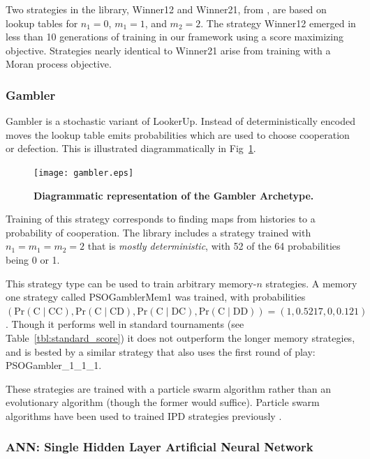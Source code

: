\documentclass[10pt,letterpaper]{article}
\begin{document}
Two strategies in the library, Winner12 and Winner21, from \cite{Mathieu2015},
are based on lookup tables for $n_1 = 0$, $m_1 = 1$, and $m_2=2$. The strategy
Winner12 emerged in less than 10 generations of training in our framework using
a score maximizing objective. Strategies nearly identical to Winner21 arise
from training with a Moran process objective.

\subsubsection*{Gambler}\label{sec:gambler}

Gambler is a stochastic variant of LookerUp. Instead of deterministically
encoded moves the lookup table emits probabilities which are
used to choose cooperation or defection.
This is illustrated diagrammatically in Fig~\ref{fig:gambler}.

\begin{figure}[!hbtp]
    \centering
    \texttt{[image: gambler.eps]}
    \caption{\bf Diagrammatic representation of the Gambler Archetype.}
    \label{fig:gambler}
\end{figure}

Training of this strategy corresponds to finding maps from histories to
a probability of cooperation. The library includes a strategy trained
with $n_1 = m_1 = m_2 = 2$ that is \emph{mostly deterministic}, with 52 of the 64
probabilities being 0 or 1. 

This strategy type can be used to train arbitrary memory-$n$ strategies. A
memory one strategy called PSOGamblerMem1 was trained, with
probabilities $(\text{Pr}(\text{C}\;|\;\text{CC}),
                \text{Pr}(\text{C}\;|\;\text{CD}),
                \text{Pr}(\text{C}\;|\;\text{DC}),
                \text{Pr}(\text{C}\;|\;\text{DD})) = (1, 0.5217, 0, 0.121)$.
Though it performs well in standard tournaments (see
Table~\ref{tbl:standard_score})
it does not outperform the longer memory strategies, and is bested by a similar
strategy that also uses the first round of play: PSOGambler\_1\_1\_1.

These strategies are trained with a particle swarm algorithm rather than an
evolutionary algorithm (though the former would suffice). Particle swarm
algorithms have been used to trained IPD strategies previously
\cite{franken2005particle}.

\subsubsection*{ANN: Single Hidden Layer Artificial Neural Network}\label{sec:ann}
\end{document}

